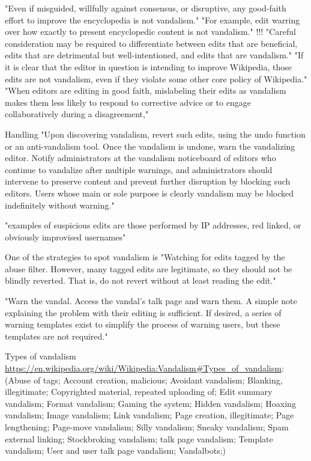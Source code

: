 "Even if misguided, willfully against consensus, or disruptive, any good-faith effort to improve the encyclopedia is not vandalism."
"For example, edit warring over how exactly to present encyclopedic content is not vandalism." !!!
"Careful consideration may be required to differentiate between edits that are beneficial, edits that are detrimental but well-intentioned, and edits that are vandalism."
"If it is clear that the editor in question is intending to improve Wikipedia, those edits are not vandalism, even if they violate some other core policy of Wikipedia."
"When editors are editing in good faith, mislabeling their edits as vandalism makes them less likely to respond to corrective advice or to engage collaboratively during a disagreement,"

Handling
"Upon discovering vandalism, revert such edits, using the undo function or an anti-vandalism tool. Once the vandalism is undone, warn the vandalizing editor. Notify administrators at the vandalism noticeboard of editors who continue to vandalize after multiple warnings, and administrators should intervene to preserve content and prevent further disruption by blocking such editors. Users whose main or sole purpose is clearly vandalism may be blocked indefinitely without warning."

"examples of suspicious edits are those performed by IP addresses, red linked, or obviously improvised usernames"

One of the strategies to spot vandalism is "Watching for edits tagged by the abuse filter. However, many tagged edits are legitimate, so they should not be blindly reverted. That is, do not revert without at least reading the edit."

"Warn the vandal. Access the vandal's talk page and warn them. A simple note explaining the problem with their editing is sufficient. If desired, a series of warning templates exist to simplify the process of warning users, but these templates are not required."

Types of vandalism \url{https://en.wikipedia.org/wiki/Wikipedia:Vandalism#Types_of_vandalism}:
  (Abuse of tags; Account creation, malicious; Avoidant vandalism; Blanking, illegitimate; Copyrighted material, repeated uploading of; Edit summary vandalism; Format vandalism; Gaming the system; Hidden vandalism; Hoaxing vandalism; Image vandalism; Link vandalism; Page creation, illegitimate; Page lengthening; Page-move vandalism; Silly vandalism; Sneaky vandalism; Spam external linking; Stockbroking vandalism; talk page vandalism; Template vandalism; User and user talk page vandalism; Vandalbots;)

